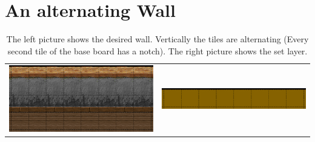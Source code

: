 \newpage
\FloatBarrier
\section{An alternating Wall} \label{alternatingWall}
\begin{table}[h!]
	\begin{tabular}{c c}
	\includegraphics[scale=0.5]{Example/LoneCoder/alternatingwalls/desired.eps} &
	\includegraphics[scale=0.5]{Example/LoneCoder/alternatingwalls/setlayer.eps} \\
	\end{tabular}
  \caption{The left picture shows the desired wall. Vertically the tiles are alternating (Every second tile of the base board has a notch). The right picture shows the set layer.}
  \label{desiredAlternativeWall}
\end{table}

